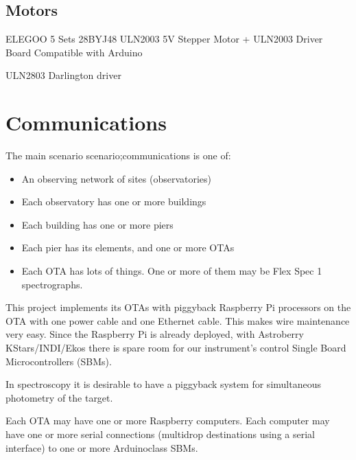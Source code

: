 \documentclass[letterpaper,10pt,english,openany,oneside]{sphinxmanual}
\begin{document}
\section{Motors}
\label{\detokenize{controls:motors}}
\sphinxAtStartPar
ELEGOO 5 Sets 28BYJ\sphinxhyphen{}48 ULN2003 5V Stepper Motor + ULN2003 Driver Board Compatible with Arduino

\sphinxAtStartPar
ULN2803 Darlington driver


\chapter{Communications}
\label{\detokenize{communication:communications}}\label{\detokenize{communication::doc}}
\sphinxAtStartPar
The main scenario scenario;communications is one of:
\begin{itemize}
\item {} 
\sphinxAtStartPar
An observing network of sites (observatories)

\item {} 
\sphinxAtStartPar
Each observatory has one or more buildings

\item {} 
\sphinxAtStartPar
Each building has one or more piers

\item {} 
\sphinxAtStartPar
Each pier has its elements, and one or more OTAs

\item {} 
\sphinxAtStartPar
Each OTA has lots of things. One or more of them may be Flex Spec 1 spectrographs.

\end{itemize}

\sphinxAtStartPar
This project implements its OTAs with piggy\sphinxhyphen{}back Raspberry Pi processors
on the OTA with one power cable and one Ethernet cable. This makes wire
maintenance very easy. Since the Raspberry Pi is already deployed, with
Astroberry KStars/INDI/Ekos \textendash{} there is spare room for our instrument’s
control Single Board Microcontrollers (SBMs).

\sphinxAtStartPar
In spectroscopy it is desirable to have a piggy\sphinxhyphen{}back system for simultaneous
photometry of the target.

\sphinxAtStartPar
Each OTA may have one or more Raspberry computers. Each computer may have one or
more serial connections (multi\sphinxhyphen{}drop destinations using a serial interface)
to one or more Arduino\sphinxhyphen{}class SBMs.
\end{document}
